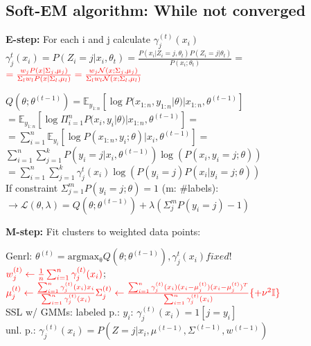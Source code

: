 \subsection*{Soft-EM algorithm: While not converged}
\textbf{E-step:} For each i and j calculate $\gamma_j^{(t)}(x_i)$\\
$\gamma_j^t(x_i) = P(Z_i=j|x_i, \theta_t) = \frac{P(x_i|Z_i=j, \theta_t) P(Z_i=j|\theta_t)}{P(x_i;\theta_t)}=$\\
$\color{red} =\frac{w_j P(x|\Sigma_j,\mu_j)}{\Sigma_l w_l P(x|\Sigma_l,\mu_l)}  
=\frac{w_j \mathcal{N}(x;\Sigma_j,\mu_j)}{\Sigma_l w_l \mathcal{N}(x;\Sigma_l,\mu_l)}$


$Q(\theta;\theta^{(t-1)})=\mathbb{E}_{y_{1:n}}[\log P(x_{1:n},y_{1:n}|\theta)|x_{1:n},\theta^{(t-1)}]$ 
$=\mathbb{E}_{y_{1:n}}[\log \Pi_{i=1}^nP(x_i,y_i|\theta)|x_{1:n},\theta^{(t-1)}]=$ \\
$=\sum_{i=1}^n \mathbb{E}_{y_i}[\log P(x_{1:n},y_i;\theta)|x_i,\theta^{(t-1)}] = $ \\
$\sum_{i=1}^n \sum_{j=1}^k P(y_i=j|x_i,\theta^{(t-1)})\log (P(x_i,y_i=j;\theta) )$ \\
$=\sum_{i=1}^n \sum_{j=1}^k \gamma_{j}^t(x_i) \log (P(y_i=j)P(x_i|y_i=j;\theta) )$ \\
If constraint $\Sigma_{j=1}^m P(y_i=j;\theta)=1$ (m: \#labels):
$\rightarrow \mathcal{L}(\theta,\lambda)=Q(\theta;\theta^{(t-1)})+
\lambda(\Sigma_j^mP(y_i=j)-1) $


\textbf{M-step:} Fit clusters to weighted data points:

Genrl: $\theta^{(t)} = \operatorname{argmax_\theta} Q(\theta;\theta^{(t-1)}), \gamma_{j}^t(x_i) fixed!$\\
$\color{red} w_j^{(t)} \leftarrow \frac{1}{n} \sum_{i=1}^n \gamma_j^{(t)} (x_i)$;  %
$\color{red} \mu_j^{(t)} \leftarrow \frac{\sum_{i=1}^n \gamma_j^{(t)} (x_i) x_i}{\sum_{i=1}^n \gamma_j^{(t)} (x_i)}\\ %
\Sigma_j^{(t)} \leftarrow \frac{\sum_{i=1}^n \gamma_j^{(t)}(x_i) (x_i - \mu_j^{(t)}) (x_i - \mu_j^{(t)})^T}{\sum_{i=1}^n \gamma_j^{(t)}(x_i)} \{+\nu^2\mathbb{I}\}$\\ %

SSL w/ GMMs: labeled p.: $y_i$: $\gamma_j^{(t)}(x_i) = 1[j = y_i]$\\
unl. p.: $\gamma_j^{(t)}(x_i) = P(Z=j|x_i, \mu^{(t-1)}, \Sigma^{(t-1)}, w^{(t-1)})$

